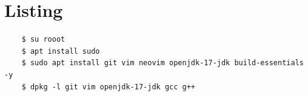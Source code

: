 \documentclass[draft]{article}
\begin{document}
\inputminted{c}{../proceso.c}

\section{Listing}

\begin{verbatim}
	$ su rooot
	$ apt install sudo
	$ sudo apt install git vim neovim openjdk-17-jdk build-essentials -y
	$ dpkg -l git vim openjdk-17-jdk gcc g++
\end{verbatim}


		
	
\end{document}
